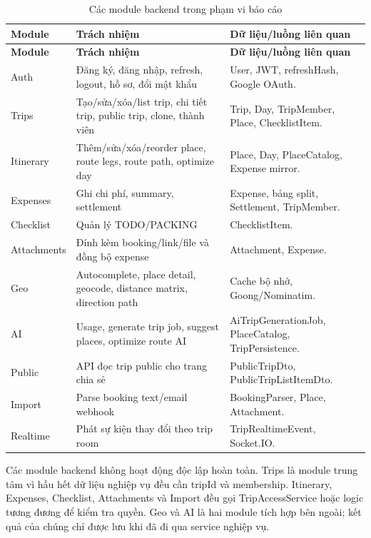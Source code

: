 \documentclass[a4paper]{report}
\begin{document}
\begin{longtable}{|P{3.1cm}|P{5.4cm}|P{7cm}|}
\caption{Các module backend trong phạm vi báo cáo}\\
\hline
\textbf{Module} & \textbf{Trách nhiệm} & \textbf{Dữ liệu/luồng liên quan}\\
\hline
\endfirsthead
\hline
\textbf{Module} & \textbf{Trách nhiệm} & \textbf{Dữ liệu/luồng liên quan}\\
\hline
\endhead
Auth & Đăng ký, đăng nhập, refresh, logout, hồ sơ, đổi mật khẩu & User, JWT, refreshHash, Google OAuth.\\
\hline
Trips & Tạo/sửa/xóa/list trip, chi tiết trip, public trip, clone, thành viên & Trip, Day, TripMember, Place, ChecklistItem.\\
\hline
Itinerary & Thêm/sửa/xóa/reorder place, route legs, route path, optimize day & Place, Day, PlaceCatalog, Expense mirror.\\
\hline
Expenses & Ghi chi phí, summary, settlement & Expense, bảng split, Settlement, TripMember.\\
\hline
Checklist & Quản lý TODO/PACKING & ChecklistItem.\\
\hline
Attachments & Đính kèm booking/link/file và đồng bộ expense & Attachment, Expense.\\
\hline
Geo & Autocomplete, place detail, geocode, distance matrix, direction path & Cache bộ nhớ, Goong/Nominatim.\\
\hline
AI & Usage, generate trip job, suggest places, optimize route AI & AiTripGenerationJob, PlaceCatalog, TripPersistence.\\
\hline
Public & API đọc trip public cho trang chia sẻ & PublicTripDto, PublicTripListItemDto.\\
\hline
Import & Parse booking text/email webhook & BookingParser, Place, Attachment.\\
\hline
Realtime & Phát sự kiện thay đổi theo trip room & TripRealtimeEvent, Socket.IO.\\
\hline
\end{longtable}

Các module backend không hoạt động độc lập hoàn toàn. Trips là module trung tâm vì hầu hết dữ liệu nghiệp vụ đều cần tripId và membership. Itinerary, Expenses, Checklist, Attachments và Import đều gọi TripAccessService hoặc logic tương đương để kiểm tra quyền. Geo và AI là hai module tích hợp bên ngoài; kết quả của chúng chỉ được lưu khi đã đi qua service nghiệp vụ.
\end{document}
